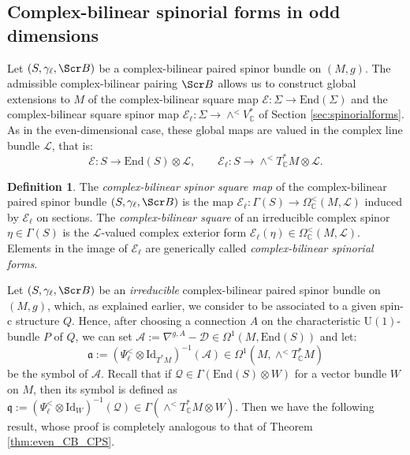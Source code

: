 \documentclass[10pt,a4paper,twoside,reqno]{amsart}
\theoremstyle{plain}
\theoremstyle{definition}
\newtheorem{definition}[thm]{Definition}
\theoremstyle{remark}
\newcommand{\End}{\mathrm{End}}
\def\C{\mathbb{C}}
\def\cQ{\mathcal{Q}}
\def\Id{\mathrm{Id}}
\def\fra{\mathfrak{a}}
\def\frq{\mathfrak{q}}
\def\scB{\Scr B}
\def\U{\mathrm{U}}
\def\cD{\mathcal{D}}
\def\cA{\mathcal{A}}
\def\cE{\mathcal{E}}
\def\cL{\mathcal{L}}
\begin{document}

\subsection{Complex-bilinear spinorial forms in odd dimensions}


Let $(S,\gamma_\ell,\scB)$ be a complex-bilinear paired spinor bundle on $(M,g)$. The admissible complex-bilinear pairing $\scB$ allows us to construct global extensions to $M$ of the complex-bilinear square map $\cE\colon\Sigma\to\End(\Sigma)$ and the complex-bilinear square spinor map $\cE_\ell\colon\Sigma\to\wedge^<V^*_\C$ of Section \ref{sec:spinorialforms}. As in the even-dimensional case, these global maps are valued in the complex line bundle $\cL$, that is:
\begin{equation*}
\cE\colon S\to\End(S)\otimes\cL,\qquad \cE_\ell\colon S\to\wedge^<T^*_\C M\otimes\cL.
\end{equation*}

\begin{definition}
The \emph{complex-bilinear spinor square map} of the complex-bilinear paired spinor bundle $(S,\gamma_\ell,\scB)$ is the map $\cE_\ell\colon\Gamma(S)\to\Omega^<_\C(M,\cL)$ induced by $\cE_\ell$ on sections. The \emph{complex-bilinear square} of an irreducible complex spinor $\eta\in\Gamma(S)$ is the $\cL$-valued complex exterior form $\cE_\ell(\eta)\in\Omega^<_\C(M,\cL)$. Elements in the image of $\cE_\ell$ are generically called \emph{complex-bilinear spinorial forms}.
\end{definition}

Let $(S,\gamma_\ell,\scB)$ be an \emph{irreducible} complex-bilinear paired spinor bundle on $(M,g)$, which, as explained earlier, we consider to be associated to a given spin-c structure $Q$. Hence, after choosing a connection $A$ on the characteristic $\U(1)$-bundle $P$ of $Q$, we can set $\cA:=\nabla^{g,A}-\cD\in\Omega^1(M,\End(S))$  and let: $$\fra:=(\Psi^<_\ell\otimes\Id_{T^*M})^{-1}(\cA)\in\Omega^1(M,\wedge^<T^*_\C M)$$ be the symbol of $\cA$. Recall that if $\cQ\in\Gamma(\End(S)\otimes W)$ for a vector bundle $W$ on $M$, then its symbol is defined as $\frq:=(\Psi^<_\ell\otimes\Id_W)^{-1}(\cQ)\in\Gamma(\wedge^<T^*_\C M\otimes W)$. Then we have the following result, whose proof is completely analogous to that of Theorem \ref{thm:even_CB_CPS}.
\end{document}
